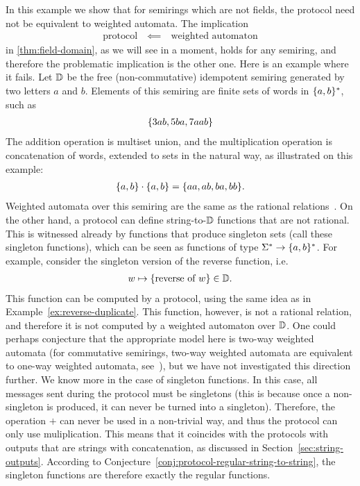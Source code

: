 \begin{myexample}
    \label{ex:non-commutative-semirings} In this example we show that for semirings which are not fields, the protocol need not be equivalent to weighted automata.  The implication 
    \begin{align*}
    \text{protocol} \quad \impliedby \quad \text{weighted automaton}
    \end{align*}
    in \cref{thm:field-domain}, as we will see in a moment, holds for any semiring, and therefore the problematic implication is the other one. Here is an example where it fails.
    Let $\mathbb D$ be  the free (non-commutative) idempotent semiring generated by two letters $a$ and $b$. Elements of this semiring are finite sets of words in $\{a,b\}^*$, such as 
    \begin{align*}
    \{3ab, 5ba, 7aab\}
    \end{align*}
    The addition operation is multiset union, and the multiplication operation is concatenation of words, extended to sets in the natural way, as illustrated on this example:
    \begin{align*}
    \{a,b\}\cdot \{a,b\} = \{aa, ab, ba, bb\}.
    \end{align*}
    Weighted automata over this semiring are the same as the rational relations~\cite[Chapter IX]{Eilenberg74}. On the other hand, a protocol can define string-to-$\mathbb D$ functions that are not rational. This is witnessed already by functions that produce singleton sets (call these singleton functions), which can be seen as functions of type $\Sigma^* \to \{a,b\}^*$. For example, consider the singleton version of the  reverse function, i.e.
    \begin{align*}
    w \mapsto \{\text{reverse of $w$}\} \in \mathbb D.
    \end{align*}
    This function can be computed by a protocol, using the same idea as in Example~\ref{ex:reverse-duplicate}. This function, however, is not a rational relation, and therefore it is not computed by a weighted automaton over $\mathbb D$. One could perhaps conjecture that the appropriate model here is two-way weighted automata (for commutative semirings, two-way weighted automata are equivalent to one-way weighted automata, see~\cite[Theorem 1]{anselmo1990two}), but we have not investigated this direction further.
    We know more in the case of singleton functions. In this case, all messages sent during the protocol must be singletons (this is because once a non-singleton is produced, it can never be turned into a singleton). Therefore, the operation $+$ can never be used in a non-trivial way, and thus the protocol can only use muliplication. This means that it coincides with the protocols with outputs that are strings with concatenation, as discussed in Section~\ref{sec:string-outputs}. According to Conjecture~\ref{conj:protocol-regular-string-to-string}, the singleton functions are therefore exactly the regular functions.
\end{myexample}


